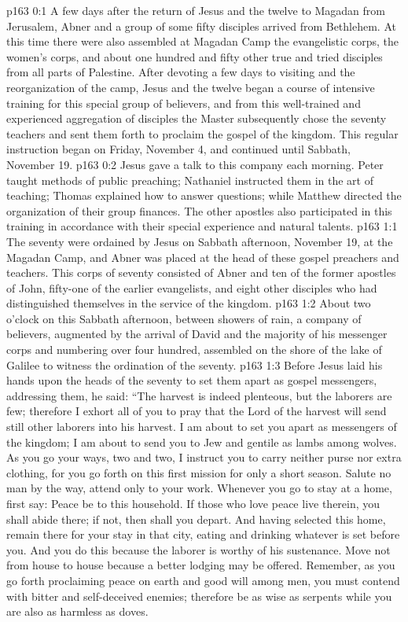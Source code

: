 \author{Midwayer Commission}
\vs p163 0:1 A few days after the return of Jesus and the twelve to Magadan from Jerusalem, Abner and a group of some fifty disciples arrived from Bethlehem. At this time there were also assembled at Magadan Camp the evangelistic corps, the women’s corps, and about one hundred and fifty other true and tried disciples from all parts of Palestine. After devoting a few days to visiting and the reorganization of the camp, Jesus and the twelve began a course of intensive training for this special group of believers, and from this well\hyp{}trained and experienced aggregation of disciples the Master subsequently chose the seventy teachers and sent them forth to proclaim the gospel of the kingdom. This regular instruction began on Friday, November 4, and continued until Sabbath, November 19.\plusone
\vs p163 0:2 Jesus gave a talk to this company each morning. Peter taught methods of public preaching; Nathaniel instructed them in the art of teaching; Thomas explained how to answer questions; while Matthew directed the organization of their group finances. The other apostles also participated in this training in accordance with their special experience and natural talents.
\vs p163 1:1 The seventy were ordained by Jesus on Sabbath afternoon, November 19, at the Magadan Camp, and Abner was placed at the head of these gospel preachers and teachers. This corps of seventy consisted of Abner and ten of the former apostles of John, fifty\hyp{}one of the earlier evangelists, and eight other disciples who had distinguished themselves in the service of the kingdom.
\vs p163 1:2 About two o’clock on this Sabbath afternoon, between showers of rain, a company of believers, augmented by the arrival of David and the majority of his messenger corps and numbering over four hundred, assembled on the shore of the lake of Galilee to witness the ordination of the seventy.
\vs p163 1:3 Before Jesus laid his hands upon the heads of the seventy to set them apart as gospel messengers, addressing them, he said: \textcolor{ubdarkred}{“The harvest is indeed plenteous, but the laborers are few; therefore I exhort all of you to pray that the Lord of the harvest will send still other laborers into his harvest. I am about to set you apart as messengers of the kingdom; I am about to send you to Jew and gentile as lambs among wolves. As you go your ways, two and two, I instruct you to carry neither purse nor extra clothing, for you go forth on this first mission for only a short season. Salute no man by the way, attend only to your work. Whenever you go to stay at a home, first say: Peace be to this household. If those who love peace live therein, you shall abide there; if not, then shall you depart. And having selected this home, remain there for your stay in that city, eating and drinking whatever is set before you. And you do this because the laborer is worthy of his sustenance. Move not from house to house because a better lodging may be offered. Remember, as you go forth proclaiming peace on earth and good will among men, you must contend with bitter and self\hyp{}deceived enemies; therefore be as wise as serpents while you are also as harmless as doves.}
